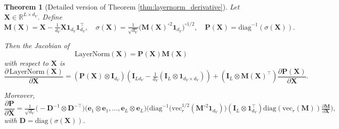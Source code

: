\documentclass{article}
\newtheorem{theorem}{Theorem} %
\begin{document}
\begin{theorem} [Detailed version of Theorem \ref{thm:layernorm_derivative}]
    

    Let $\mathbf{X} \in \mathbb{R}^{L \times d_V}$. Define
\[
\mathbf{M}(\mathbf{X}) = \mathbf{X} - \tfrac{1}{d_V}\mathbf{X}\mathbf{1}_{d_V}\mathbf{1}_{d_V}^\top,
\quad
\sigma(\mathbf{X}) = \tfrac{1}{\sqrt{d_V}}\big(\mathbf{M}(\mathbf{X})^{\circ 2}\mathbf{1}_{d_V}\big)^{\circ 1/2},
\quad
\mathbf{P}(\mathbf{X}) = \mathrm{diag}^{-1}(\sigma(\mathbf{X})).
\]

Then the Jacobian of
\[
\text{LayerNorm}(\mathbf{X}) = \mathbf{P}(\mathbf{X}) \mathbf{M}(\mathbf{X})
\]
with respect to $\mathbf{X}$ is
\[
\frac{\partial \,\text{LayerNorm}(\mathbf{X})}{\partial \mathbf{X}}
= (\mathbf{P}(\mathbf{X}) \otimes \mathbf{I}_{d_V})
\left(\mathbf{I}_{Ld_V} - \tfrac{1}{d_V}(\mathbf{I}_L \otimes \mathbf{1}_{d_V \times d_V})\right)
+ (\mathbf{I}_L \otimes \mathbf{M}(\mathbf{X})^\top) \frac{\partial \mathbf{P}(\mathbf{X})}{\partial \mathbf{X}} .
\]

Moreover,
\[
\frac{\partial \mathbf{P}}{\partial \mathbf{X}}
= \tfrac{1}{\sqrt{d_V}}
\Big( -\mathbf{D}^{-1} \otimes \mathbf{D}^{-\top} \Big)
\big( \mathbf{e}_1 \otimes \mathbf{e}_1, \dots, \mathbf{e}_L \otimes \mathbf{e}_L \big)
\Big( 
\mathrm{diag}^{-1}\!\big(\mathrm{vec}_r^{1/2}(\mathbf{M}^{\circ 2}\mathbf{1}_{d_V})\big)
(\mathbf{I}_L \otimes \mathbf{1}_{d_V}^\top)
\mathrm{diag}(\mathrm{vec}_r(\mathbf{M}))
\tfrac{\partial \mathbf{M}}{\partial \mathbf{X}}
\Big),
\]
with $\mathbf{D} = \mathrm{diag}(\sigma(\mathbf{X}))$.
    
\end{theorem}
\end{document}
